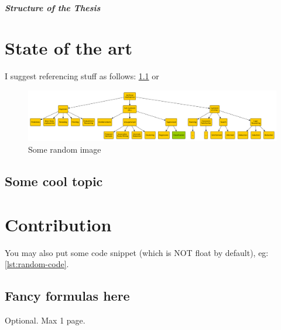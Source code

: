 \documentclass[12pt,a4paper,openright,twoside]{book}
\begin{document}
\paragraph{Structure of the Thesis}


\chapter{State of the art}

I suggest referencing stuff as follows: \cref{fig:random-image} or 

\begin{figure}
    \centering
    \includegraphics[width=.8\linewidth]{figures/random-image.pdf}
    \caption{Some random image}
    \label{fig:random-image}
\end{figure}

\section{Some cool topic}

\chapter{Contribution}

You may also put some code snippet (which is NOT float by default), eg: \cref{lst:random-code}.



\section{Fancy formulas here}


\backmatter

\nocite{*} %




\begin{acknowledgements} %
Optional. Max 1 page.
\end{acknowledgements}
\end{document}
